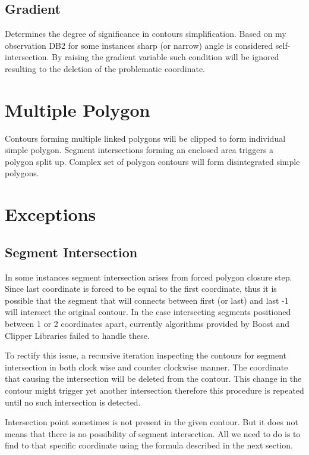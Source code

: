 \documentclass{sig-alternate}
\begin{document}
\subsection{Gradient}
Determines the degree of significance in  contours simplification. Based on my observation DB2 for some instances sharp (or narrow)  angle is considered self-intersection. By raising the gradient variable such condition will be ignored resulting to the deletion of the problematic coordinate.

\section{Multiple Polygon}
Contours forming multiple linked polygons will be clipped to form individual simple polygon. Segment intersections forming an enclosed area triggers a polygon split up. Complex set of polygon contours will form disintegrated simple polygons.

\section{Exceptions}
\subsection{Segment Intersection}
In some instances segment intersection arises from forced polygon closure step. Since last coordinate is forced to be equal to the first coordinate, thus it is possible that the segment  that will connects between  first (or last) and last -1 will intersect the original contour.
In the case intersecting segments positioned between 1 or 2 coordinates apart, currently algorithms provided by Boost and Clipper Libraries failed to handle these.

To rectify this issue, a recursive iteration inspecting the contours for segment intersection in both clock wise and counter clockwise manner. The coordinate that causing the intersection will be deleted from the contour. This change in the contour might trigger yet another intersection therefore this procedure is repeated until no such intersection is detected.

Intersection point sometimes is not present in the given contour. But it does not means that there is no possibility of segment intersection. All we need to do is to find to that specific coordinate using the formula described in the next section.
\end{document}
